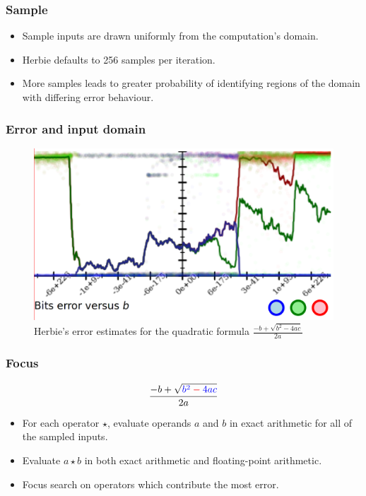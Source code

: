 \documentclass{beamer}
\begin{document}
\begin{frame}
  \frametitle{Sample}
  \begin{itemize}
    \item Sample inputs are drawn uniformly from the computation's
      domain.
    \item Herbie defaults to 256 samples per iteration.
    \item More samples leads to greater probability of identifying
      regions of the domain with differing error behaviour.
  \end{itemize}
\end{frame}

\begin{frame}
  \frametitle{Error and input domain}

  \begin{figure}
    \includegraphics[scale=0.2]{img/quadratic-b}
    \caption{Herbie's error estimates for the quadratic formula \( \frac{-b + \sqrt{b^2 - 4ac}}{2a} \)}
  \end{figure}
\end{frame}

\begin{frame}
  \frametitle{Focus}

  \[ \frac{-b + \sqrt{\color{blue} b^2 \color
      {red} - \color{blue} 4ac}\color{black}}{2a} \]

  \begin{itemize}
  \item For each operator \( \star \), evaluate operands \( a \) and
    \( b \) in exact arithmetic for all of the sampled inputs.
  \item Evaluate \( a \star b \) in both exact arithmetic and
    floating-point arithmetic.
  \item Focus search on operators which contribute the most error.
  \end{itemize}


\end{frame}
\end{document}
